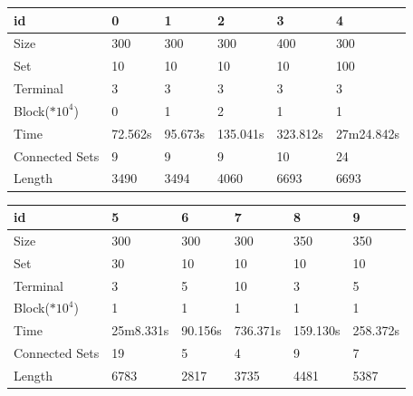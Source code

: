 \documentclass[12pt, a4paper]{article}
\begin{document}
\begin{flushleft}
			\begin{tabular}{l l l l l l}
			\textbf{id} & \textbf{0} & \textbf{1} & \textbf{2} & \textbf{3} & \textbf{4} \\
			\midrule
			Size & 300 & 300 & 300 & 400 & 300 \\
			Set & 10 & 10 & 10 & 10 & 100 \\
			Terminal & 3 & 3 & 3 & 3 & 3 \\
			Block($*10^4$) & 0 & 1 & 2 & 1 & 1 \\
			Time  & 72.562s & 95.673s & 135.041s & 323.812s & 27m24.842s \\
			Connected Sets & 9 & 9 & 9 & 10 & 24 \\
			Length & 3490 & 3494 & 4060 & 6693 & 6693 \\
			\bottomrule
			\end{tabular}

			\begin{tabular}{l l l l l l}
			\textbf{id} & \textbf{5} & \textbf{6} & \textbf{7} & \textbf{8} & \textbf{9}\\
			\midrule
			Size & 300 & 300 & 300 & 350 & 350 \\
			Set & 30 & 10 & 10 & 10 & 10 \\
			Terminal & 3 & 5 & 10 & 3 & 5 \\
			Block($*10^4$) & 1 & 1 & 1 & 1 & 1 \\
			Time  & 25m8.331s & 90.156s & 736.371s & 159.130s & 258.372s  \\
			Connected Sets & 19 & 5 & 4 & 9 & 7  \\
			Length & 6783 & 2817 & 3735 & 4481 & 5387  \\
			\bottomrule
			\end{tabular}
\end{flushleft}

	
\end{document}
